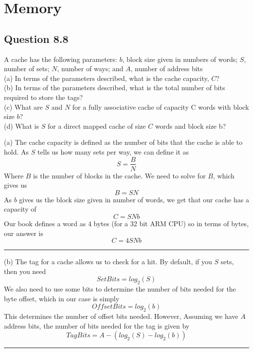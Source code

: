 \documentclass[12pt, letter]{article}
\begin{document}
	\section{Memory}
	
	\subsection{Question 8.8}
	\begin{tcolorbox}[colback = bg, boxrule = 0pt]
		 A cache has the following parameters: $b$, block size given in numbers of words; $S$, number of sets; $N$, number of ways; and $A$, number of address bits\\

		(a) In terms of the parameters described, what is the cache capacity, $C$?\\
		(b) In terms of the parameters described, what is the total number of bits required to store the tags?\\
		(c) What are $S$ and $N$ for a fully associative cache of capacity C words with block size $b$?\\
		(d) What is $S$ for a direct mapped cache of size $C$ words and block size b?
	\end{tcolorbox}
	\bigskip
	
	(a) The cache capacity is defined as the number of bits that the cache is able to hold. As $S$ tells us how many sets per way, we can define it as 
	\begin{equation}
		S = \frac{B}{N}
	\end{equation}
	Where $B$ is the number of blocks in the cache. We need to solve for $B$, which gives us
	\begin{equation}
		B= SN
	\end{equation}
	As $b$ gives us the block size given in number of words, we get that our cache has a capacity of 
	\begin{equation}
		C = SNb
	\end{equation}
	Our book defines a word as 4 bytes (for a 32 bit ARM CPU) so in terms of bytes, our answer is
	\begin{equation}
		C = 4SNb
	\end{equation}
	\hrule
	\bigskip
	(b) The tag for a cache allows us to check for a hit. By default, if you $S$ sets, then you need 
	\begin{equation}
		SetBits = log_2(S)
	\end{equation}
	We also need to use some bits to determine the number of bits needed for the byte offset, which in our case is simply
	\begin{equation}
		OffsetBits = log_2(b)
	\end{equation}
	This determines the number of offset bits needed. However, Assuming we have $A$ address bits, the number of bits needed for the tag is given by
	\begin{equation}
		TagBits = A - (log_2(S) - log_2(b))
	\end{equation}
	\hrule
	\bigskip
	
\end{document}
